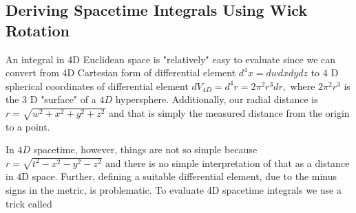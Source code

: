 \subsection{Deriving Spacetime Integrals Using Wick Rotation}
An integral in 4D Euclidean space is "relatively" easy to evaluate since we can convert from 4D Cartesian form of differential element $d^{4} x=dw dx d y d z$ to 4 D spherical coordinates of differential element $d V_{4 D}=d^{4} r=2 \pi^{2} r^{3} d r,$ where $2 \pi^{2} r^{3}$ is the 3 D "surface" of a $4 D$ hypersphere. Additionally, our radial distance is $r=\sqrt{w^{2}+x^{2}+y^{2}+z^{2}}$ and that is simply the measured distance from the origin to a point.

In $4 D$ spacetime, however, things are not so simple because $r=\sqrt{t^{2}-x^{2}-y^{2}-z^{2}}$ and there is no simple interpretation of that as a distance in $4 \mathrm{D}$ space. Further, defining a suitable differential element, due to the minus signs in the metric, is problematic. To evaluate 4D spacetime integrals we use a trick called \textbf{}


